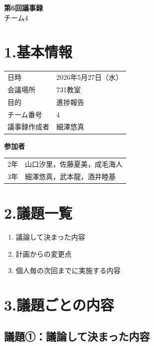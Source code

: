 \documentclass[a4paper,12pt]{ltjsarticle}
\begin{document}
\begin{center}
  {\Large \textbf{第6回議事録}}\\[8pt]
  {\large チーム4}
\end{center}

\vspace{4mm}

\section*{1.基本情報}
\begin{tabular}{ll}
  \toprule
  日時     & 2026年5月27日（水） \\
  会議場所 & 731教室 \\
  目的     & 進捗報告 \\
  チーム番号 & 4 \\
  議事録作成者 & 細澤悠真 \\
  \bottomrule
\end{tabular}

\vspace{4mm}
\noindent\textbf{参加者}

\begin{tabular}{ll}
  2年 & 山口汐里，佐藤夏美，成毛海人 \\
  3年 & 細澤悠真，武本龍，酒井睦基 \\
\end{tabular}

\section*{2.議題一覧}
\begin{enumerate}[label=議題\arabic*：]
  \item 議論して決まった内容
  \item 計画からの変更点
  \item 個人毎の次回までに実施する内容
\end{enumerate}

\section*{3.議題ごとの内容}

\subsection*{議題①：議論して決まった内容}
\end{document}
